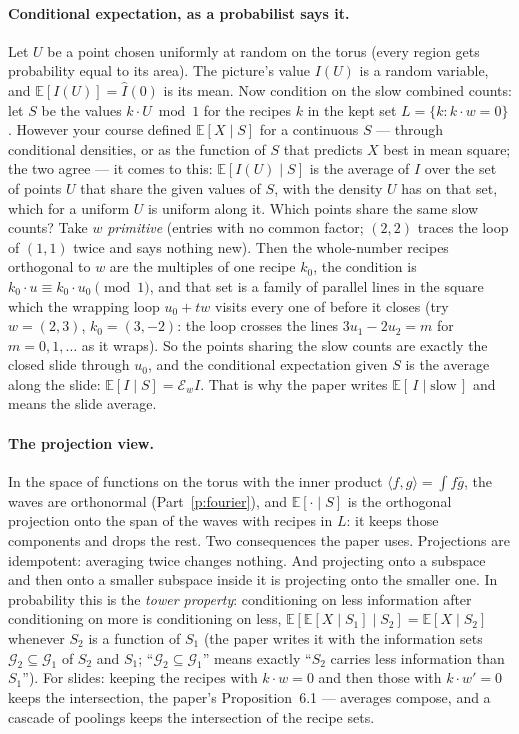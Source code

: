 \documentclass[10pt]{article}
\theoremstyle{plain}
\theoremstyle{definition}
\newcommand{\E}{\mathbb{E}}
\begin{document}
\paragraph{Conditional expectation, as a probabilist says it.}
Let $U$ be a point chosen uniformly at random on the torus (every region
gets probability equal to its area). The picture's value $I(U)$ is a random
variable, and $\E[I(U)]=\hat I(0)$ is its mean. Now condition on the slow
combined counts: let $S$ be the values $k\cdot U\bmod1$ for the recipes $k$
in the kept set $L=\{k:k\cdot w=0\}$. However your course defined
$\E[X\mid S]$ for a continuous $S$ --- through conditional densities, or
as the function of $S$ that predicts $X$ best in mean square; the two
agree --- it comes to this: $\E[I(U)\mid S]$ is the average of $I$ over the
set of points $U$ that share the given values of $S$, with the density $U$
has on that set, which for a uniform $U$ is uniform along it. Which points
share the same slow counts? Take $w$ \emph{primitive} (entries with no
common factor; $(2,2)$ traces the loop of $(1,1)$ twice and says nothing
new). Then the whole-number recipes orthogonal to $w$ are the multiples of
one recipe $k_0$, the condition is $k_0\cdot u\equiv k_0\cdot u_0\pmod1$,
and that set is a family of parallel lines in the square which the
wrapping loop $u_0+tw$ visits every one of before it closes (try
$w=(2,3)$, $k_0=(3,-2)$: the loop crosses the lines $3u_1-2u_2=m$ for
$m=0,1,\dots$ as it wraps). So the points sharing the slow counts are
exactly the closed slide through $u_0$, and the conditional expectation
given $S$ is the average along the slide: $\E[I\mid S]=\mathcal E_wI$. That
is why the paper writes $\E[\,I\mid\text{slow}\,]$ and means the slide
average.

\paragraph{The projection view.}
In the space of functions on the torus with the inner product
$\langle f,g\rangle=\int f\bar g$, the waves are orthonormal (Part~\ref{p:fourier}),
and $\E[\cdot\mid S]$ is the orthogonal projection onto the span of the
waves with recipes in $L$: it keeps those components and drops the rest.
Two consequences the paper uses. Projections are idempotent: averaging
twice changes nothing. And projecting onto a subspace and then onto a
smaller subspace inside it is projecting onto the smaller one. In
probability this is the \emph{tower property}: conditioning on less
information after conditioning on more is conditioning on less,
$\E[\E[X\mid S_1]\mid S_2]=\E[X\mid S_2]$ whenever $S_2$ is a function of
$S_1$ (the paper writes it with the information sets $\mathcal G_2\subseteq\mathcal G_1$
of $S_2$ and $S_1$; ``$\mathcal G_2\subseteq\mathcal G_1$'' means exactly
``$S_2$ carries less information than $S_1$''). For slides: keeping the
recipes with $k\cdot w=0$ and then those with $k\cdot w'=0$ keeps the
intersection, the paper's Proposition~6.1 --- averages compose, and a
cascade of poolings keeps the intersection of the recipe sets.
\end{document}
